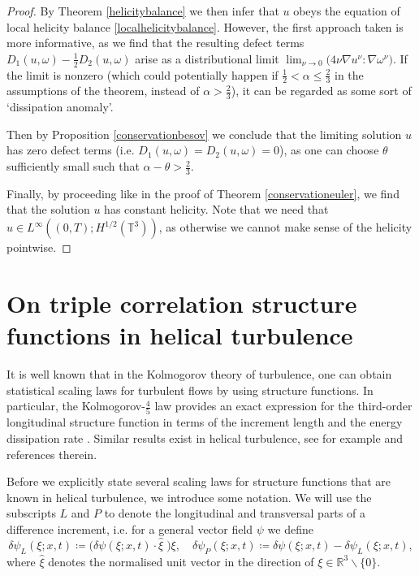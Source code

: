 \documentclass[12pt,a4paper]{article}
\theoremstyle{definition}
\theoremstyle{remark}
\numberwithin{equation}{section}
\begin{document}
\begin{proof}
By Theorem \ref{helicitybalance} we then infer that $u$ obeys the equation of local helicity balance \eqref{localhelicitybalance}. However, the first approach taken is more informative, as we find that the resulting defect terms $D_1 (u,\omega) - \frac{1}{2} D_2 (u, \omega)$ arise as a distributional limit $\lim_{\nu \rightarrow 0} \big( 4 \nu \nabla u^\nu : \nabla \omega^\nu \big)$. If the limit is nonzero (which could potentially happen if $\frac{1}{2} < \alpha \leq \frac{2}{3}$ in the assumptions of the theorem, instead of $\alpha > \frac{2}{3}$), it can be regarded as some sort of `dissipation anomaly'. 

Then by Proposition \ref{conservationbesov} we conclude that the limiting solution $u$ has zero defect terms (i.e. $D_1 (u, \omega) = D_2 (u, \omega) = 0$), as one can choose $\theta$ sufficiently small such that $\alpha - \theta > \frac{2}{3}$. 

Finally, by proceeding like in the proof of Theorem \ref{conservationeuler}, we find that the solution $u$ has constant helicity. Note that we need that $u \in L^\infty ((0,T); H^{1/2} (\mathbb{T}^3))$, as otherwise we cannot make sense of the helicity pointwise. 
\end{proof}

\section{On triple correlation structure functions in helical turbulence} \label{triplecorrsection}
It is well known that in the Kolmogorov theory of turbulence, one can obtain statistical scaling laws for turbulent flows by using structure functions. In particular, the Kolmogorov-$\frac{4}{5}$ law provides an exact expression for the third-order longitudinal structure function in terms of the increment length and the energy dissipation rate \cite{frisch}. Similar results exist in helical turbulence, see for example \cite{alexakis} and references therein. 

Before we explicitly state several scaling laws for structure functions that are known in helical turbulence, we introduce some notation. We will use the subscripts $L$ and $P$ to denote the longitudinal and transversal parts of a difference increment, i.e. for a general vector field $\psi$ we define
\begin{equation}
\delta \psi_L (\xi;x,t) \coloneqq \big( \delta \psi (\xi;x,t) \cdot \widehat{\xi} \; \big) \xi, \quad \delta \psi_{P} (\xi;x,t) \coloneqq \delta \psi(\xi;x,t) - \delta \psi_L (\xi; x,t),
\end{equation}
where $\widehat{\xi}$ denotes the normalised unit vector in the direction of $\xi \in \mathbb{R}^3 \backslash \{ 0 \}$. 
\end{document}
